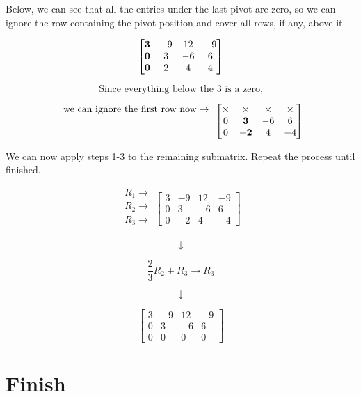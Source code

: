\documentclass[
  letterpaper,
  DIV=11,
  numbers=noendperiod]{scrreprt}
\begin{document}
Below, we can see that all the entries under the last pivot are zero, so
we can ignore the row containing the pivot position and cover all rows,
if any, above it.

\[
\begin{bmatrix}
    \bf{3} & -9 & 12 & -9 \\
    \bf{0} & 3 & -6 & 6 \\
    \bf{0} & 2 & 4 & 4
\end{bmatrix}
\]

\[
\text{Since everything below the 3 is a zero,}
\]

\[
\begin{array}{c}
    \text{we can ignore the first row now} \rightarrow \\
                                \\
                                \\
\end{array}
\begin{bmatrix}
    \times & \times & \times & \times \\
    0 & \bf{3} & -6 & 6 \\
    0 & \bf{-2} & 4 & -4
\end{bmatrix}
\]

We can now apply steps 1-3 to the remaining submatrix. Repeat the
process until finished.

\[
\begin{array}{c}
    R_1 \rightarrow \\
    R_2 \rightarrow \\
    R_3 \rightarrow \\
\end{array}
\begin{bmatrix}
    3 & -9 & 12 & -9 \\
    0 & 3 & -6 & 6 \\
    0 & -2 & 4 & -4
\end{bmatrix}
\]

\[
\downarrow
\]

\[
\frac{2}{3}R_2 + R_3 \rightarrow R_3
\]

\[
\downarrow
\]

\[
\begin{bmatrix}
    3 & -9 & 12 & -9 \\
    0 & 3 & -6 & 6 \\
    0 & 0 & 0 & 0
\end{bmatrix}
\]

\chapter{Finish}
\end{document}
